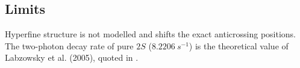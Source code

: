 \subsection{Limits}
Hyperfine structure is not modelled and shifts the exact anticrossing positions. The two-photon decay rate of pure $2S$ ($8.2206\ \si{s^{-1}}$) is the theoretical value of Labzowsky et al. (2005), quoted in \cite{arxiv1711}.
